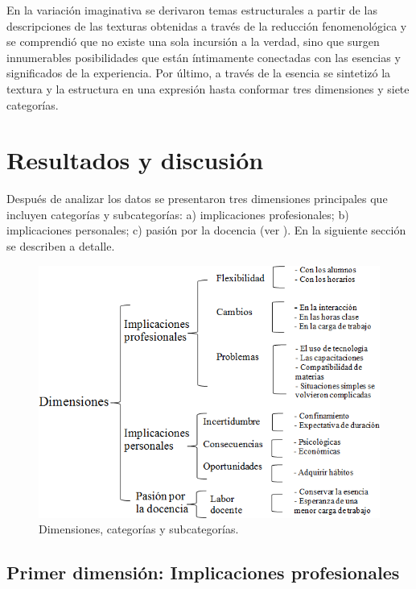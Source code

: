 \documentclass[spanish]{textolivre}
\begin{document}
En la variación imaginativa se derivaron temas estructurales a partir de las descripciones de las texturas obtenidas a través de la reducción fenomenológica y se comprendió que no existe una sola incursión a la verdad, sino que surgen innumerables posibilidades que están íntimamente conectadas con las esencias y significados de la experiencia. Por último, a través de la esencia se sintetizó la textura y la estructura en una expresión hasta conformar tres dimensiones y siete categorías. 

\section{Resultados y discusión}

Después de analizar los datos se presentaron tres dimensiones principales que incluyen categorías y subcategorías: a) implicaciones profesionales; b) implicaciones personales; c) pasión por la docencia (ver ). En la siguiente sección se describen a detalle.

\begin{figure}[h!]
\centering
\begin{minipage}{.9\textwidth}
\includegraphics[width=\textwidth]{figura02.png}
\caption{Dimensiones, categorías y subcategorías.}
\label{Figura02}
\end{minipage}
\end{figure}

\subsection{Primer dimensión: Implicaciones profesionales}
\end{document}
